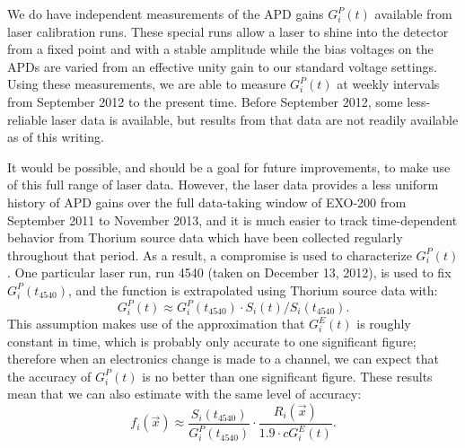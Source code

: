 We do have independent measurements of the APD gains $G^P_i(t)$ available from laser calibration runs.  These special runs allow a laser to shine into the detector from a fixed point and with a stable amplitude while the bias voltages on the APDs are varied from an effective unity gain to our standard voltage settings.  Using these measurements, we are able to measure $G^P_i(t)$ at weekly intervals from September 2012 to the present time.  Before September 2012, some less-reliable laser data is available, but results from that data are not readily available as of this writing.

It would be possible, and should be a goal for future improvements, to make use of this full range of laser data.  However, the laser data provides a less uniform history of APD gains over the full data-taking window of EXO-200 from September 2011 to November 2013, and it is much easier to track time-dependent behavior from Thorium source data which have been collected regularly throughout that period.  As a result, a compromise is used to characterize $G^P_i(t)$.  One particular laser run, run 4540 (taken on December 13, 2012), is used to fix $G^P_i(t_{4540})$, and the function is extrapolated using Thorium source data with:
\[G^P_i(t) \approx G^P_i(t_{4540}) \cdot S_i(t)/S_i(t_{4540}).\]
This assumption makes use of the approximation that $G^E_i(t)$ is roughly constant in time, which is probably only accurate to one significant figure; therefore when an electronics change is made to a channel, we can expect that the accuracy of $G^P_i(t)$ is no better than one significant figure.  These results mean that we can also estimate with the same level of accuracy:
\[f_i(\vec{x}) \approx \frac{S_i(t_{4540})}{G^P_i(t_{4540})} \cdot \frac{R_i(\vec{x})}{1.9 \cdot c G^E_i(t)}.\]

